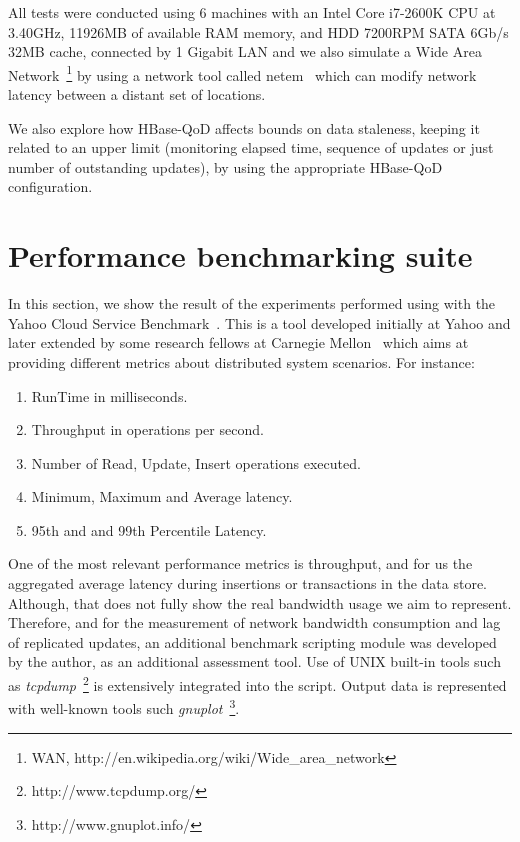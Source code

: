 All tests were conducted using 6 machines with an Intel Core i7-2600K CPU at 3.40GHz, 11926MB of available RAM memory, and HDD 7200RPM SATA 6Gb/s 32MB cache, connected by 1 Gigabit LAN and we also simulate a Wide Area Network~\footnote{WAN, http://en.wikipedia.org/wiki/Wide\_area\_network} by using a network tool called netem~\cite{netem:2005} which can modify network latency between a distant set of locations.

We also explore how HBase-QoD affects bounds on data staleness, keeping it related to an upper limit (monitoring elapsed time, sequence of updates or just number of outstanding updates), by using the appropriate HBase-QoD configuration.

\section{Performance benchmarking suite}
In this section, we show the result of the experiments performed using with the Yahoo Cloud Service Benchmark~\cite{YCSB:2010}. This is a tool developed initially at Yahoo and later extended by some research fellows at Carnegie Mellon~\cite{Patil:2011} which aims at providing different metrics about distributed system scenarios. For instance:

\begin{enumerate}
\item RunTime in milliseconds.
\item Throughput in operations per second.
\item Number of Read, Update, Insert operations executed.
\item Minimum, Maximum and Average latency.
\item 95th and and 99th Percentile Latency.
\end{enumerate}

One of the most relevant performance metrics is throughput, and for us the aggregated average latency during insertions or transactions in the data store. Although, that does not fully show the real bandwidth usage we aim to represent. Therefore, and for the measurement of network bandwidth consumption and lag of replicated updates, an additional benchmark scripting module was developed by the author, as an additional assessment tool. Use of UNIX built-in tools such as \emph{tcpdump}~\footnote{http://www.tcpdump.org/} is extensively integrated into the script. Output data is represented with well-known tools such \emph{gnuplot}~\footnote{http://www.gnuplot.info/}.

